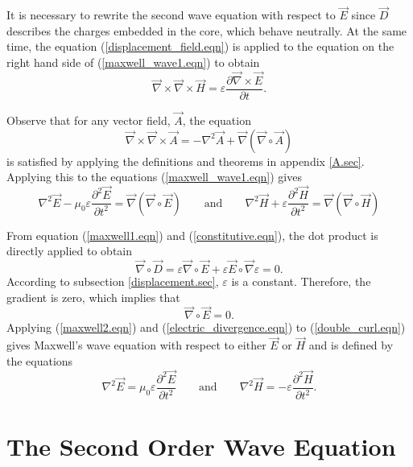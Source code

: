 \documentclass[12pt]{article}
\theoremstyle{definition}
\numberwithin{equation}{section}
\begin{document}
It is necessary to rewrite the second wave equation with respect to $\vec{E}$ since $\vec{D}$ describes the charges embedded in the core, which behave neutrally. At the same time, the equation (\ref{displacement_field.eqn}) is applied to the equation on the right hand side of (\ref{maxwell_wave1.eqn}) to obtain
$$\vec{\nabla}\times\vec{\nabla}\times\vec{H}=\varepsilon\frac{\partial\vec{\nabla}\times\vec{E}}{\partial t}.$$

Observe that for any vector field, $\vec{A}$, the equation
$$\vec{\nabla}\times\vec{\nabla}\times\vec{A}=-\nabla^2\vec{A}+\vec{\nabla}\left(\vec{\nabla}\circ\vec{A}\right)$$
is satisfied by applying the definitions and theorems in appendix \ref{A.sec}. Applying this to the equations (\ref{maxwell_wave1.eqn}) gives
\begin{equation}
\nabla^2\vec{E}-\mu_0\varepsilon\frac{\partial^2\vec{E}}{\partial t^2}=\vec{\nabla}\left(\vec{\nabla}\circ\vec{E}\right)\qquad\mbox{and}\qquad\nabla^2\vec{H}+\varepsilon\frac{\partial^2\vec{H}}{\partial t^2}=\vec{\nabla}\left(\vec{\nabla}\circ\vec{H}\right)
\label{double_curl.eqn}
\end{equation}

From equation (\ref{maxwell1.eqn}) and (\ref{constitutive.eqn}), the dot product is directly applied to obtain
$$\vec{\nabla}\circ\vec{D}=\varepsilon\vec{\nabla}\circ\vec{E}+\varepsilon\vec{E}\circ\vec{\nabla}\varepsilon=0.$$ According to subsection \ref{displacement.sec}, $\varepsilon$ is a constant. Therefore, the gradient is zero, which implies that 
\begin{equation}
\vec{\nabla}\circ\vec{E}=0.
\label{electric_divergence.eqn}
\end{equation}
Applying (\ref{maxwell2.eqn}) and (\ref{electric_divergence.eqn}) to (\ref{double_curl.eqn}) gives Maxwell's wave equation with respect to either $\vec{E}$ or $\vec{H}$ and is defined by the equations
\begin{equation}
\nabla^2\vec{E}=\mu_0\varepsilon\frac{\partial^2\vec{E}}{\partial t^2}\qquad\mbox{and}\qquad\nabla^2\vec{H}=-\varepsilon\frac{\partial^2\vec{H}}{\partial t^2}.
\label{maxwell_wave.eqn}
\end{equation}
\section{The Second Order Wave Equation}
\end{document}
